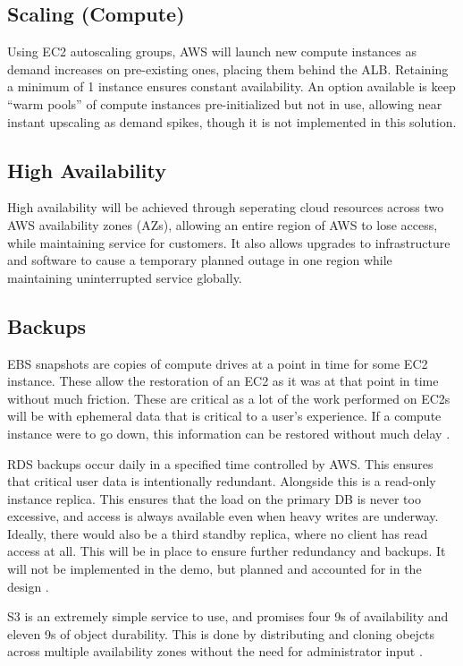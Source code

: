 \subsection{Scaling (Compute)}

Using EC2 autoscaling groups, AWS will launch new compute instances as demand increases on pre-existing ones, placing them behind the ALB. Retaining a minimum of 1 instance ensures constant availability. An option available is keep ``warm pools'' of compute instances pre-initialized but not in use, allowing near instant upscaling as demand spikes, though it is not implemented in this solution.

\subsection{High Availability}

High availability will be achieved through seperating cloud resources across two AWS availability zones (AZs), allowing an entire region of AWS to lose access, while maintaining service for customers. It also allows upgrades to infrastructure and software to cause a temporary planned outage in one region while maintaining uninterrupted service globally.

\subsection{Backups}

EBS snapshots are copies of compute drives at a point in time for some EC2 instance. These allow the restoration of an EC2 as it was at that point in time without much friction. These are critical as a lot of the work performed on EC2s will be with ephemeral data that is critical to a user's experience. If a compute instance were to go down, this information can be restored without much delay \autocite{amazonwebservicesAmazonEBS2023}.

RDS backups occur daily in a specified time controlled by AWS. This ensures that critical user data is intentionally redundant. Alongside this is a read-only instance replica. This ensures that the load on the primary DB is never too excessive, and access is always available even when heavy writes are underway. Ideally, there would also be a third standby replica, where no client has read access at all. This will be in place to ensure further redundancy and backups. It will not be implemented in the demo, but planned and accounted for in the design \autocite{amazonwebservicesEncryptingAmazonRDS2023}.

S3 is an extremely simple service to use, and promises four 9s of availability and eleven 9s of object durability. This is done by distributing and cloning obejcts across multiple availability zones without the need for administrator input \autocite{amazonwebservicesAmazonSimpleStorage2023}.
